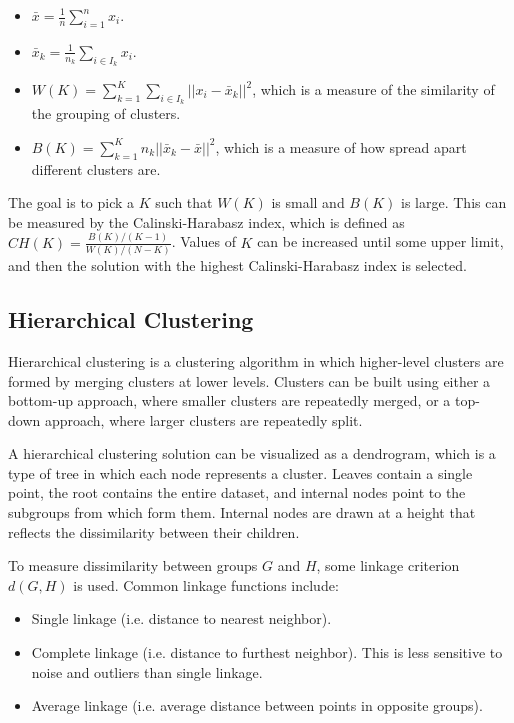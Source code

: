 \documentclass[12pt,titlepage]{article}
\begin{document}
        \begin{itemize}
          \item $\bar{x} = \frac{1}{n} \sum_{i=1}^n x_i$.
          \item $\bar{x}_k = \frac{1}{n_k} \sum_{i \in I_k} x_i$.
          \item $W(K) = \sum_{k=1}^K \sum_{i \in I_k} ||x_i - \bar{x}_k||^2$, which is a measure of the similarity of the grouping of clusters.
          \item $B(K) = \sum_{k=1}^K n_k ||\bar{x}_k - \bar{x}||^2$, which is a measure of how spread apart different clusters are.
        \end{itemize}

        The goal is to pick a $K$ such that $W(K)$ is small and $B(K)$ is large. This can be measured by the Calinski-Harabasz index, which is
        defined as $CH(K) = \frac{B(K)/(K-1)}{W(K)/(N - K)}$. Values of $K$ can be increased until some upper limit, and then the solution with
        the highest  Calinski-Harabasz index is selected.

    \subsection{Hierarchical Clustering}
      Hierarchical clustering is a clustering algorithm in which higher-level clusters are formed by merging clusters at lower levels. Clusters
      can be built using either a bottom-up approach, where smaller clusters are repeatedly merged, or a top-down approach, where larger clusters
      are repeatedly split.

      A hierarchical clustering solution can be visualized as a dendrogram, which is a type of tree in which each node represents a cluster. Leaves
      contain a single point, the root contains the entire dataset, and internal nodes point to the subgroups from which form them. Internal nodes
      are drawn at a height that reflects the dissimilarity between their children.

      To measure dissimilarity between groups $G$ and $H$, some linkage criterion $d(G, H)$ is used. Common linkage functions include:
      \begin{itemize}
        \item Single linkage (i.e. distance to nearest neighbor).
        \item Complete linkage (i.e. distance to furthest neighbor). This is less sensitive to noise and outliers than single linkage.
        \item Average linkage (i.e. average distance between points in opposite groups).
      \end{itemize}
\end{document}
